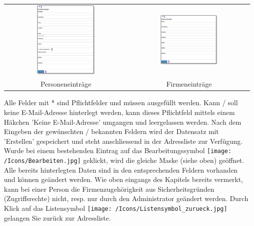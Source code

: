 \begin{tabular}{cc} %
\includegraphics[width=0.49\textwidth]{../chapters/03_Adressliste/pictures/3-2_Personeneintraege.jpg} & \includegraphics[width=0.49\textwidth]{../chapters/03_Adressliste/pictures/3-2_Firmeneintraege.jpg} \\
Personeneinträge & Firmeneinträge \\
\end{tabular}


\vspace{\baselineskip}
Alle Felder mit * sind Pflichtfelder und müssen ausgefüllt werden. Kann / soll keine E-Mail-Adresse hinterlegt werden, kann dieses Pflichtfeld mittels einem Häkchen 'Keine E-Mail-Adresse'  umgangen und leergelassen werden. Nach dem Eingeben der gewünschten / bekannten Feldern wird der Datensatz mit 'Erstellen'  gespeichert und steht anschliessend in der Adressliste zur Verfügung. Wurde bei einem bestehenden Eintrag auf das Bearbeitungssymbol \texttt{[image: /Icons/Bearbeiten.jpg]} geklickt, wird die gleiche Maske (siehe oben) geöffnet. Alle bereits hinterlegten Daten sind in den entsprechenden Feldern vorhanden und können geändert werden. Wie oben eingangs des Kapitels bereits vermerkt, kann bei einer Person die Firmenzugehörigkeit aus Sicherheitsgründen (Zugriffsrechte) nicht, resp. nur durch den Administrator geändert werden.\newline
Durch Klick auf das Listensymbol \texttt{[image: /Icons/Listensymbol\_zurueck.jpg]}  gelangen Sie zurück zur Adressliste.
